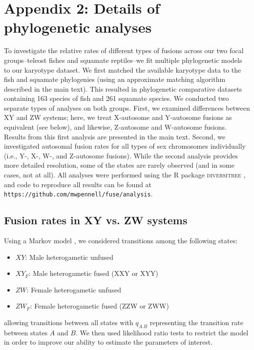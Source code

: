 \documentclass[12pt,twoside]{article}
\begin{document}
\section{Appendix 2: Details of phylogenetic analyses}

To investigate the relative rates of different types of fusions across our two focal groups--teleost fishes and squamate reptiles--we fit multiple phylogenetic models to our karyotype dataset. We first matched the available karyotype data to the fish \citep{Rabosky2013} and squamate \citep{squamatetree, PyronBurbrink2014} phylogenies (using an approximate matching algorithm described in the main text). This resulted in phylogenetic comparative datasets containing 163 species of fish and 261 squamate species.  We conducted two separate types of analyses on both groups. First, we examined differences between XY and ZW systems; here, we treat X-autosome and Y-autosome fusions as equivalent (see below), and likewise, Z-autosome and W-autosome fusions. Results from this first analysis are presented in the main text. Second, we investigated autosomal fusion rates for all types of sex chromosomes individually (i.e., Y-, X-, W-, and Z-autosome fusions). While the second analysis provides more detailed resolution, some of the states are rarely observed (and in some cases, not at all). All analyses were performed using the R package \textsc{diversitree} \citep{FitzJohn2012}, and code to reproduce all results can be found at \texttt{https://github.com/mwpennell/fuse/analysis}. 

\subsection{Fusion rates in XY vs. ZW systems}

Using a Markov model \citep{Pagel1994}, we considered transitions among the following states:
\begin{itemize}
\item $XY$: Male heterogametic unfused
\item $XY_F$: Male heterogametic fused (XXY or XYY)
\item $ZW$: Female heterogametic unfused
\item $ZW_F$: Female heterogametic fused (ZZW or ZWW)
\end{itemize}
allowing transitions between all states with $q_{A.B}$ representing the transition rate between states $A$ and $B$. We then used likelihood ratio tests to restrict the model in order to improve our ability to estimate the parameters of interest. 
\end{document}
